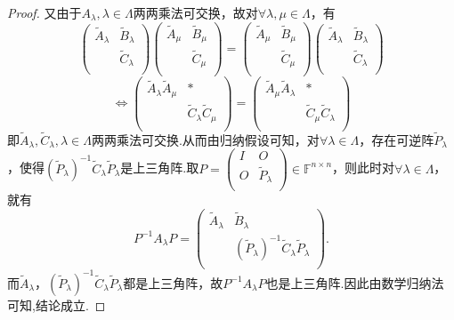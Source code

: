 \documentclass[../../main.tex]{subfiles}%
\begin{document}
\begin{proof}
又由于$A_{\lambda},\lambda \in \Lambda$两两乘法可交换，故对$\forall \lambda ,\mu \in \Lambda$，有
\[
\begin{pmatrix}
\widetilde{A}_{\lambda}&		\widetilde{B}_{\lambda}\\
&		\widetilde{C}_{\lambda}\\
\end{pmatrix} \begin{pmatrix}
\widetilde{A}_{\mu}&		\widetilde{B}_{\mu}\\
&		\widetilde{C}_{\mu}\\
\end{pmatrix} =\begin{pmatrix}
\widetilde{A}_{\mu}&		\widetilde{B}_{\mu}\\
&		\widetilde{C}_{\mu}\\
\end{pmatrix} \begin{pmatrix}
\widetilde{A}_{\lambda}&		\widetilde{B}_{\lambda}\\
&		\widetilde{C}_{\lambda}\\
\end{pmatrix} 
\]
\[
\Longleftrightarrow \begin{pmatrix}
\widetilde{A}_{\lambda}\widetilde{A}_{\mu}&		*\\
&		\widetilde{C}_{\lambda}\widetilde{C}_{\mu}\\
\end{pmatrix} =\begin{pmatrix}
\widetilde{A}_{\mu}\widetilde{A}_{\lambda}&		*\\
&		\widetilde{C}_{\mu}\widetilde{C}_{\lambda}\\
\end{pmatrix} 
\]
即$\widetilde{A}_{\lambda},\widetilde{C}_{\lambda},\lambda \in \Lambda$两两乘法可交换.从而由归纳假设可知，对$\forall \lambda \in \Lambda$，存在可逆阵$\widetilde{P}_{\lambda}$，使得$(\widetilde{P}_{\lambda})^{-1}\widetilde{C}_{\lambda}\widetilde{P}_{\lambda}$是上三角阵.取$P=\begin{pmatrix}
I&		O\\
O&		\widetilde{P}_{\lambda}\\
\end{pmatrix} \in \mathbb{F} ^{n\times n}$，则此时对$\forall \lambda \in \Lambda$，就有
\[
P^{-1}A_{\lambda}P=\begin{pmatrix}
\widetilde{A}_{\lambda}&		\widetilde{B}_{\lambda}\\
&		(\widetilde{P}_{\lambda})^{-1}\widetilde{C}_{\lambda}\widetilde{P}_{\lambda}\\
\end{pmatrix}.
\]
而$\widetilde{A}_{\lambda}$，$(\widetilde{P}_{\lambda})^{-1}\widetilde{C}_{\lambda}\widetilde{P}_{\lambda}$都是上三角阵，故$P^{-1}A_{\lambda}P$也是上三角阵.因此由数学归纳法可知,结论成立.
\end{proof}
\end{document}
